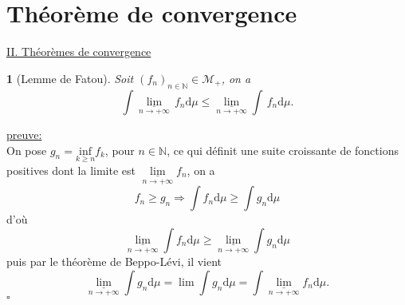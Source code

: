 \documentclass[8pt,notheorems]{beamer}
\def \N{\mathbb N}
\def \liminf{\underset{n\rightarrow+\infty}{\underline{\lim}}}
\newtheorem{lemma}{\translate{Lemme}}
\theoremstyle{definition}
\theoremstyle{example}
\theoremstyle{mystyle}
\theoremstyle{plain}
\begin{document}
\section{Théorème de convergence}
\begin{frame}[allowframebreaks]
\underline{II. Théorèmes de convergence}
\begin{lemma}[Lemme de Fatou]
Soit $(f_n)_{n\in\N}\in\mathcal{M}_{+}$, on a
$$
\int \liminf \, f_{n}\text{d}\mu\leq \liminf\int \, f_{n}\text{d}\mu.
$$
\end{lemma}
\underline{preuve:}\\
On pose $g_n=\underset{k\geq n}{\text{inf}}f_k$, pour $n\in\N$, ce qui définit une suite croissante de fonctions positives dont la limite est $\liminf f_n$, on a
$$
f_n\geq g_n \Rightarrow \int f_n\text{d}\mu\geq \int g_n\text{d}\mu
$$
d'où
$$
\liminf \int f_n\text{d}\mu\geq \liminf \int g_n\text{d}\mu
$$
puis par le théorème de Beppo-Lévi, il vient
$$
\liminf \int g_n\text{d}\mu=\lim\int g_n\text{d}\mu=\int \liminf f_n\text{d}\mu.
$$
\flushright$\square$
\flushleft


\end{frame}
\end{document}
